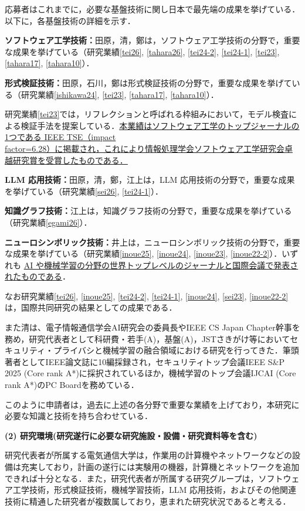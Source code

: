 \documentclass[11pt,a4j,dvipdfmx]{jarticle} 					%
\newcommand{\研究課題名}{大量の脆弱性・攻撃手段・パッチの依存関係を考慮した証明付き修正計画の自動生成}
\newcommand{\研究機関名}{電気通信大学}
\newcommand{\研究代表者氏名}{田原 康之}
\newcommand{\研究期間の最終元号年度}{12}  %
\begin{document}
応募者はこれまでに，必要な基盤技術に関し日本で最先端の成果を挙げている．以下に，各基盤技術の詳細を示す．

\noindent \textbf{ソフトウェア工学技術：}田原，清，鄭は，ソフトウェア工学技術の分野で，重要な成果を挙げている（研究業績\ref{tei26}, \ref{tahara26}, \ref{tei24-2}, \ref{tei24-1}, \ref{tei23}, \ref{tahara17}, \ref{tahara10}）．

\noindent \textbf{形式検証技術：}田原，石川，鄭は形式検証技術の分野で，重要な成果を挙げている（研究業績\ref{ishikawa24}, \ref{tei23}, \ref{tahara17}, \ref{tahara10}）．

研究業績\ref{tei23}では，リフレクションと呼ばれる枠組みにおいて，モデル検査による検証手法を提案している．\ul{本業績はソフトウェア工学のトップジャーナルの1つである IEEE TSE（impact}\\
\ul{factor=6.28）に掲載され，これにより情報処理学会ソフトウェア工学研究会卓越研究賞を受賞したものである．}

\noindent \textbf{LLM 応用技術：}田原，清，鄭，江上は，LLM 応用技術の分野で，重要な成果を挙げている（研究業績\ref{sei26}, \ref{tei24-1}）．

\noindent \textbf{知識グラフ技術：}江上は，知識グラフ技術の分野で，重要な成果を挙げている（研究業績\ref{egami26}）．

\noindent \textbf{ニューロシンボリック技術：}井上は，ニューロシンボリック技術の分野で，重要な成果を挙げている（研究業績\ref{inoue25}, \ref{inoue24}, \ref{inoue23}, \ref{inoue22-2}）．いずれも \ul{AI や機械学習の分野の世界トップレベルのジャーナルと国際会議で発表されたものである}．

なお研究業績\ref{tei26}, \ref{inoue25}, \ref{tei24-2}, \ref{tei24-1}, \ref{inoue24}, \ref{sei23}, \ref{inoue22-2}は，国際共同研究の結果としての成果である．

また清は、電子情報通信学会AI研究会の委員長やIEEE CS Japan Chapter幹事を務め，研究代表者として科研費・若手(A)，基盤(A)，JSTさきがけ等においてセキュリティ・プライバシと機械学習の融合領域における研究を行ってきた．筆頭著者としてIEEE論文誌に10編採録され，セキュリティトップ会議IEEE S\&P 2025 (Core rank A*)に採択されているほか，機械学習のトップ会議IJCAI (Core rank A*)のPC Boardを務めている．

このように申請者は，過去に上述の各分野で重要な業績を上げており，本研究に必要な知識と技術を持ち合わせている．

\noindent\textbf{(2) 研究環境(研究遂行に必要な研究施設・設備・研究資料等を含む)}

研究代表者が所属する電気通信大学は，作業用の計算機やネットワークなどの設備は充実しており，計画の遂行には実験用の機器，計算機とネットワークを追加できれば十分となる．また，研究代表者が所属する研究グループは，ソフトウェア工学技術，形式検証技術，機械学習技術，LLM 応用技術，およびその他関連技術に精通した研究者が複数属しており，恵まれた研究状況であると考える．
\end{document}
